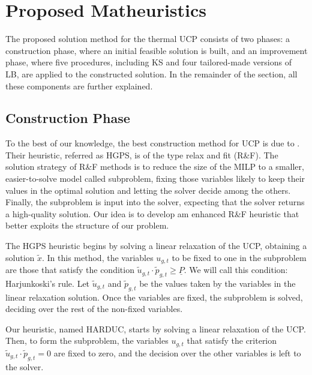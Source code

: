 \section{Proposed Matheuristics}
\label{sec:method}

The proposed solution method for the thermal UCP 
consists of two phases: a construction phase, where
an initial feasible solution is built, and an
improvement phase, where five procedures,
including KS and four tailored-made versions of LB,
are applied to the constructed solution.
In the remainder of the section, all these
components are further explained.



\subsection{Construction Phase}
\label{construction}

To the best of our knowledge, the best construction
method for UCP is due to \citet{Harjunkoski2021}.
Their heuristic, referred as HGPS, is of the type relax and fit (R\&F).
The solution strategy of R\&F methods is to reduce the size of the MILP to a smaller, easier-to-solve model called subproblem, fixing those variables likely to keep their values in the optimal solution and letting the solver decide among the others. Finally, the subproblem is input into the solver, expecting that the solver returns a high-quality solution.
Our idea is to develop am enhanced R\&F heuristic that
better exploits the structure of our problem.


The HGPS heuristic
begins by solving a linear relaxation of the UCP, obtaining a solution $\tilde{x}$. In this method, the variables $u_{g,t}$ to be fixed to one in the subproblem are those that satisfy the condition $\tilde{u}_{g,t}\cdot\tilde{p}_{g,t} \geq \underline{P}$. We will call this condition: Harjunkoski's rule. Let $\tilde{u}_{g,t}$ and $\tilde{p}_{g,t}$ be the values taken by the variables in the linear relaxation solution. Once the variables are fixed, the subproblem is solved, deciding over the rest of the non-fixed variables. 

Our heuristic, named HARDUC,
starts by solving a linear relaxation of the UCP. Then, to form the subproblem, the variables $u_{g,t}$ that satisfy the criterion $\tilde{u}_{g,t}\cdot\tilde{p}_{g,t}=0$ are fixed to zero, and the decision over the other variables is left to the solver.


